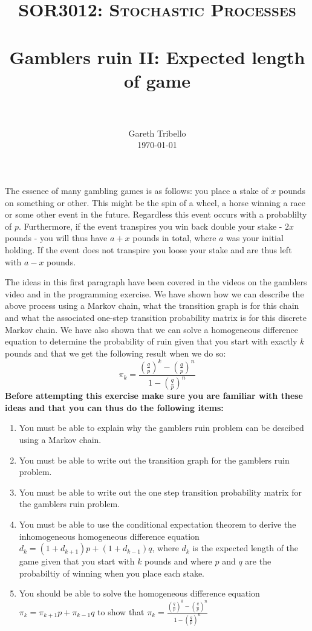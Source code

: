 \documentclass[paper=a4, fontsize=11pt]{scrartcl}
\title{\usefont{OT1}{bch}{b}{n} \normalfont \normalsize \textsc{SOR3012:
Stochastic Processes} \\ [25pt] \horrule{0.5pt} \\[0.4cm] 
\huge Gamblers ruin II: Expected length of game \\
\horrule{2pt} \\[0.25cm]
}
\author{ \normalfont
\normalsize
        Gareth Tribello \\[-3pt] \normalsize
        \today
}
\date{}
\def\bf{\normalfont\bfseries}
\numberwithin{equation}{section}
\numberwithin{figure}{section}
\numberwithin{table}{section}
\begin{document}
\maketitle

The essence of many gambling games is as follows: you place a stake of $x$ pounds on something or other.  This might be the spin of a wheel, a horse winning a race or some other event in the future.  
Regardless this event occurs with a probablilty of $p$.  Furthermore, if the event transpires you win back double your stake - $2x$ pounds - you will thus have $a + x$ pounds in total, where $a$ was 
your initial holding.  If the event does not transpire you loose your stake and are thus left with $a - x$ pounds.  

The ideas in this first paragraph have been covered in the videos on the gamblers video and in the programming exercise.  We have shown how we can describe the above process using a Markov chain, 
what the transition graph is for this chain and what the associated one-step transition probability matrix is for this discrete Markov chain.  We have also shown that we can solve a homogeneous 
difference equation to determine the probability of ruin given that you start with exactly $k$ pounds and that we get the following result when we do so:
$$
\pi_k = \frac{ \left( \frac{q}{p} \right)^k - \left( \frac{q}{p} \right)^n }{ 1 - \left( \frac{q}{p} \right)^n }
$$
{\bf Before attempting this exercise make sure you are familiar with these ideas and that you can thus do the following items:}

\begin{enumerate}
 \item You must be able to explain why the gamblers ruin problem can be descibed using a Markov chain.
 \item You must be able to write out the transition graph for the gamblers ruin problem.
 \item You must be able to write out the one step transition probability matrix for the gamblers ruin problem.
 \item You must be able to use the conditional expectation theorem to derive the inhomogeneous homogeneous difference equation $d_k = (1+d_{k+1})p + (1 + d_{k-1})q$, where $d_k$ is the 
expected length of the game given that you start with $k$ pounds and where $p$ and $q$ are the probabiltiy of winning when you place each stake.
\item You should be able to solve the homogeneous difference equation $\pi_k = \pi_{k+1} p + \pi_{k-1} q$ to show that $\pi_k = \frac{ \left( \frac{q}{p} \right)^k - \left( \frac{q}{p} 
\right)^n }{ 1 - \left( \frac{q}{p} \right)^n }$
\end{enumerate}
\end{document}
